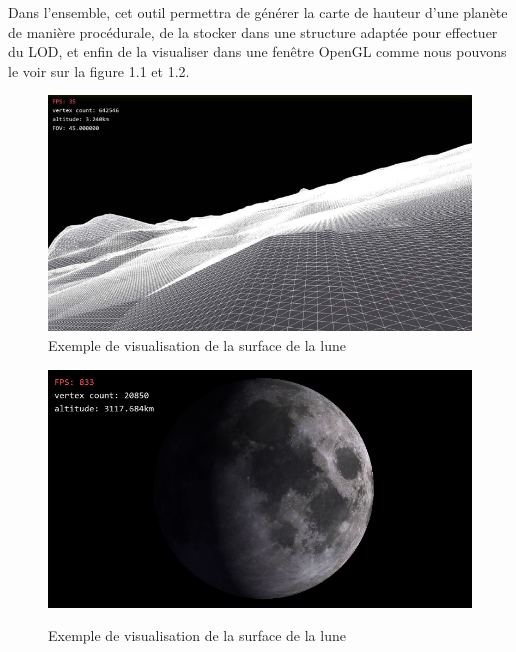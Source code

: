 \documentclass[12pt]{report}
\begin{document}
Dans l'ensemble, cet outil permettra de générer la carte de hauteur d'une planète de manière procédurale, de la stocker dans une structure adaptée pour effectuer du LOD, et enfin de la visualiser dans une fenêtre OpenGL comme nous pouvons le voir sur la figure 1.1 et 1.2. 


\vspace{0.3cm}

 \begin{figure}[h]
\centering
\begin{center}
\includegraphics[scale = 0.4]{images/Capture d’écran du 2022-03-05 15-46-04.png}
\caption{Exemple de visualisation de la surface de la lune}
\end{center}
\end{figure}

\begin{figure} [ht]
  \centering
  \begin{center}
  \includegraphics[scale = 0.4]{images/Capture d’écran du 2022-03-14 22-35-11.png}
  \caption{Exemple de visualisation de la surface de la lune}
  \label{fig:gliederung}
  \end{center}
\end{figure}
\end{document}
